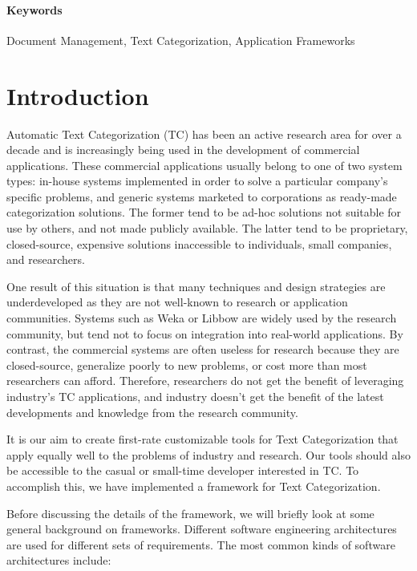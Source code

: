 \begin{singlespace}
\paragraph{Keywords} 
Document Management, Text Categorization, Application Frameworks


\section{Introduction}

Automatic Text Categorization (TC) has been an active research area
for over a decade and is increasingly being used in the development of
commercial applications.  These commercial applications usually belong to
one of two system types: in-house systems implemented in order to
solve a particular company's specific problems, and generic systems marketed to
corporations as ready-made categorization solutions.  The former tend
to be ad-hoc solutions not suitable for use by others, and not made
publicly available.  The
latter tend to be proprietary, closed-source, expensive solutions
inaccessible to individuals, small companies, and researchers.

One result of this situation is that many techniques and
design strategies are underdeveloped as they are not well-known to research or
application communities.  Systems such as Weka \cite{weka:99} or
Libbow \cite{bow:96} are widely used by the research community, but
tend not to focus on integration into real-world applications.  By
contrast, the commercial systems are often useless for research
because they are closed-source, generalize poorly to new problems, or
cost more than most researchers can afford.  Therefore, researchers do
not get the benefit of leveraging industry's TC
applications, and industry doesn't get the benefit of the latest
developments and knowledge from the research community.

It is our aim to create first-rate customizable tools for Text
Categorization that apply equally well to the problems of industry and
research.  Our tools should also be accessible to the casual or
small-time developer interested in TC.  To accomplish this, we have
implemented a framework for Text Categorization.

Before discussing the details of the framework, we will briefly look at some general
background on frameworks.  Different software engineering
architectures are used for different sets of requirements.  The most
common kinds of software architectures include:



\end{singlespace}
